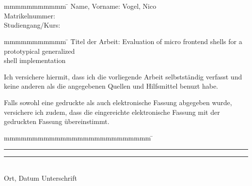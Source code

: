 
\thispagestyle{empty}

\section*{\langerklaerung}

\vspace*{2em}

\begin{spacing}{1}
	\begin{tabbing}
		mmmmmmmmmmm             \= \kill
		Name, Vorname: \> Vogel, Nico \\
		Matrikelnummer: \> \martrikelnr \\
		Studiengang/Kurs: \> \kurs \\
	\end{tabbing}
\end{spacing}

\vspace{2em}

\begin{tabbing}
	mmmmmmmmmmm             \= \kill
	Titel der Arbeit: \>Evaluation of micro frontend shells for a prototypical generalized \\
	\> shell implementation \\
\end{tabbing}

\vspace{4em}

Ich versichere hiermit, dass ich die vorliegende Arbeit selbstständig verfasst und keine anderen als die angegebenen Quellen und Hilfsmittel benuzt habe.

Falls sowohl eine gedruckte als auch elektronische Fassung abgegeben wurde, versichere ich zudem, dass die eingereichte elektronische Fassung mit der gedruckten Fassung übereinstimmt.

\vspace{5em}

\begin{tabbing}
	mmmmmmmmmmmmmmmmmmmmmmmmmm             \= \kill
	\rule{6cm}{0.4pt} \> \rule{6cm}{0.4pt} \\
	Ort, Datum \> Unterschrift
\end{tabbing}
